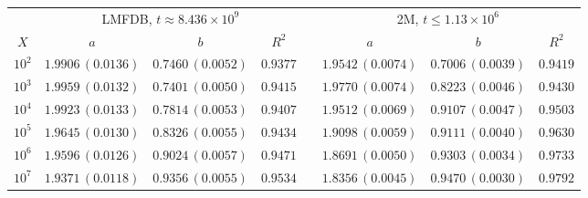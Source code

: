 \begin{tabular}{@{}c ccc c ccc@{}}
\toprule
 & \multicolumn{3}{c}{LMFDB, $t\approx8.436\times10^{9}$} & & \multicolumn{3}{c}{2M, $t\le1.13\times10^{6}$}\\
\cmidrule{2-4}\cmidrule{6-8}
$X$ & $a$ & $b$ & $R^{2}$ & & $a$ & $b$ & $R^{2}$\\
\midrule
$10^{2}$ & $1.9906\,(0.0136)$ & $0.7460\,(0.0052)$ & $0.9377$ & & $1.9542\,(0.0074)$ & $0.7006\,(0.0039)$ & $0.9419$\\
$10^{3}$ & $1.9959\,(0.0132)$ & $0.7401\,(0.0050)$ & $0.9415$ & & $1.9770\,(0.0074)$ & $0.8223\,(0.0046)$ & $0.9430$\\
$10^{4}$ & $1.9923\,(0.0133)$ & $0.7814\,(0.0053)$ & $0.9407$ & & $1.9512\,(0.0069)$ & $0.9107\,(0.0047)$ & $0.9503$\\
$10^{5}$ & $1.9645\,(0.0130)$ & $0.8326\,(0.0055)$ & $0.9434$ & & $1.9098\,(0.0059)$ & $0.9111\,(0.0040)$ & $0.9630$\\
$10^{6}$ & $1.9596\,(0.0126)$ & $0.9024\,(0.0057)$ & $0.9471$ & & $1.8691\,(0.0050)$ & $0.9303\,(0.0034)$ & $0.9733$\\
$10^{7}$ & $1.9371\,(0.0118)$ & $0.9356\,(0.0055)$ & $0.9534$ & & $1.8356\,(0.0045)$ & $0.9470\,(0.0030)$ & $0.9792$\\
\bottomrule
\end{tabular}
